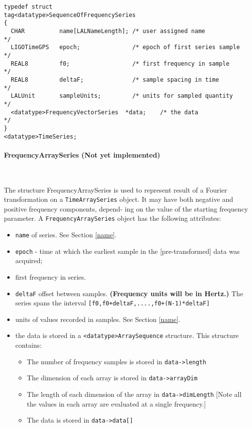\documentclass[]{ligodcc}
\renewcommand{\texttt}[1]{{\ttfamily\color{blue}#1}}
\begin{document}
{\footnotesize
\begin{verbatim}
typedef struct
tag<datatype>SequenceOfFrequencySeries
{
  CHAR          name[LALNameLength]; /* user assigned name           */
  LIGOTimeGPS   epoch;               /* epoch of first series sample */
  REAL8         f0;                  /* first frequency in sample    */
  REAL8         deltaF;              /* sample spacing in time       */
  LALUnit       sampleUnits;         /* units for sampled quantity   */
  <datatype>FrequencyVectorSeries  *data;    /* the data                     */
}
<datatype>TimeSeries;
\end{verbatim}}

\paragraph{{\texttt {FrequencyArraySeries}} {\bf (Not yet implemented)} }~


The structure FrequencyArraySeries is used to represent result of a
Fourier transformation on a {\tt TimeArraySeries} object. It may have both
negative and positive frequency components, depend- ing on the value
of the starting frequency parameter. A {\tt FrequencyArraySeries} object has
the following attributes:


\begin{itemize}
\vspace{-0.15in}
\item
{\tt name} of series. See Section \ref{name}.
\vspace{-0.15in}
\item
{\tt epoch}  -  time at which the earliest sample in the [pre-transformed]
data was acquired;
\vspace{-0.15in}
\item
first frequency in series.
\vspace{-0.15in}
\item
{\tt deltaF} offset between samples.  {\bf (Frequency units will be in Hertz.)}
The series spans the interval {\tt [f0,f0+deltaF,....,f0+(N-1)*deltaF]}
\vspace{-0.15in}
\item
units of values recorded in samples. See Section \ref{name}.
\vspace{-0.15in}
\item
the data is stored in a {\tt <datatype>ArraySequence}  structure. This
structure contains:
\begin{itemize}
\vspace{-0.1in}
\item
The number of frequency  samples is stored in {\tt data->length}
\vspace{-0.1in}
\item
The dimension of each array is stored in {\tt data->arrayDim}
\vspace{-0.1in}
\item
The length of each dimension of the array in {\tt data->dimLength}
[Note all the values in each array are evaluated at a single frequency.]
\vspace{-0.1in}
\item
The data is stored in {\tt data->data[]}
\end{itemize}
\end{itemize}
\end{document}
